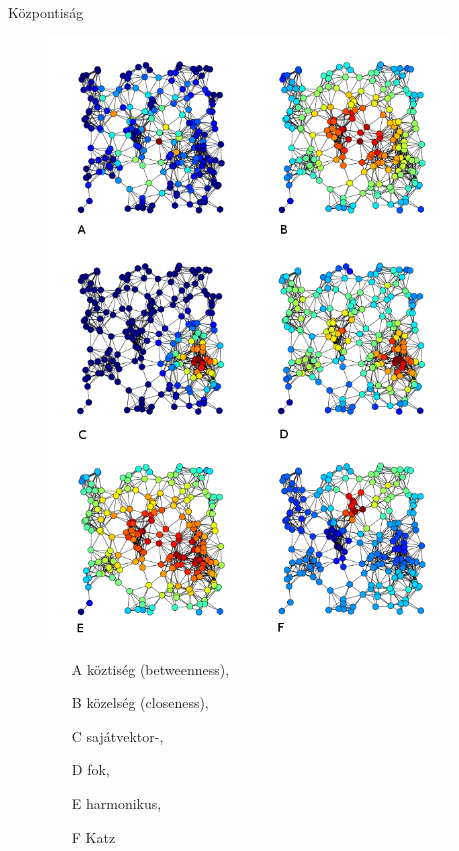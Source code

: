 \documentclass{beamer}
\newlength{\sepwid}
\newlength{\onecolwid}
\begin{document}
\begin{frame}[t]
\begin{columns}[t]
    \begin{column}{\sepwid} \end{column}			%

      \begin{column}{\onecolwid} %
        \begin{block}{Központiság}
          \begin{figure}
            \includegraphics{6_centrality_measures}
            \begin{itemize}
              \item[A] köztiség (betweenness),
              \item[B] közelség (closeness),
              \item[C] sajátvektor-,
              \item[D] fok,
              \item[E] harmonikus,
              \item[F] Katz
            \end{itemize}
          \end{figure}
        \end{block}



\end{column}
\end{columns}
\end{frame}
\end{document}
